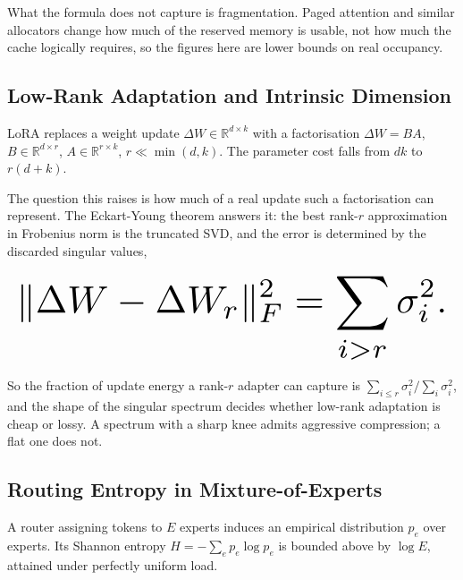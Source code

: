 \documentclass[11pt,a4paper]{article}
\begin{document}
What the formula does not capture is fragmentation. Paged attention and similar allocators change how much of the reserved memory is usable, not how much the cache logically requires, so the figures here are lower bounds on real occupancy.


\subsection{Low-Rank Adaptation and Intrinsic Dimension}


LoRA replaces a weight update $\Delta W \in \mathbb{R}^{d \times k}$ with a factorisation $\Delta W = BA$, $B \in \mathbb{R}^{d \times r}$, $A \in \mathbb{R}^{r \times k}$, $r \ll \min(d, k)$. The parameter cost falls from $dk$ to $r(d + k)$.

The question this raises is how much of a real update such a factorisation can represent. The Eckart-Young theorem answers it: the best rank-$r$ approximation in Frobenius norm is the truncated SVD, and the error is determined by the discarded singular values,










\begin{equation}
\resizebox{\columnwidth}{!}{$\displaystyle
\begin{aligned}
\|\Delta W - \Delta W_r\|_F^2 = \sum_{i > r} \sigma_i^2 .
\end{aligned}
$}
\end{equation}










So the fraction of update energy a rank-$r$ adapter can capture is $\sum_{i \le r} \sigma_i^2 / \sum_i \sigma_i^2$, and the shape of the singular spectrum decides whether low-rank adaptation is cheap or lossy. A spectrum with a sharp knee admits aggressive compression; a flat one does not.


\subsection{Routing Entropy in Mixture-of-Experts}


A router assigning tokens to $E$ experts induces an empirical distribution $p_e$ over experts. Its Shannon entropy $H = -\sum_e p_e \log p_e$ is bounded above by $\log E$, attained under perfectly uniform load.
\end{document}
